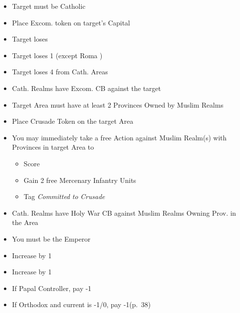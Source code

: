\documentclass[10pt]{article}
\begin{document}
\begin{itemize}
	\item Target must be Catholic
	\item Place Excom. token on target's Capital
	\item Target loses 
	\item Target loses 1 \cardinal (except Roma \cardinal)
	\item Target loses 4 \influence from Cath. Areas
	\item Cath. Realms have Excom. CB against the target
\end{itemize}

\begin{itemize}
	\item Target Area must have at least 2 Provinces Owned by Muslim Realms
	\item Place Crusade Token on the target Area
	\item You may immediately take a free  Action against Muslim Realm(s) with Provinces in target Area to
	\begin{itemize}
		\item Score 
		\item Gain 2 free Mercenary Infantry Units
		\item Tag \emph{Committed to Crusade}
	\end{itemize}
	\item Cath. Realms have Holy War CB against Muslim Realms Owning Prov. in the Area	
\end{itemize}

\begin{itemize}
	\item You must be the Emperor
	\item Increase \authority by 1
\end{itemize}

\begin{itemize}
	\item Increase \stability by 1
	\item If Papal Controller, pay -1\adminpower
	\item If Orthodox and current \stability is -1/0, pay -1\adminpower (p.~38)
\end{itemize}
\end{document}
